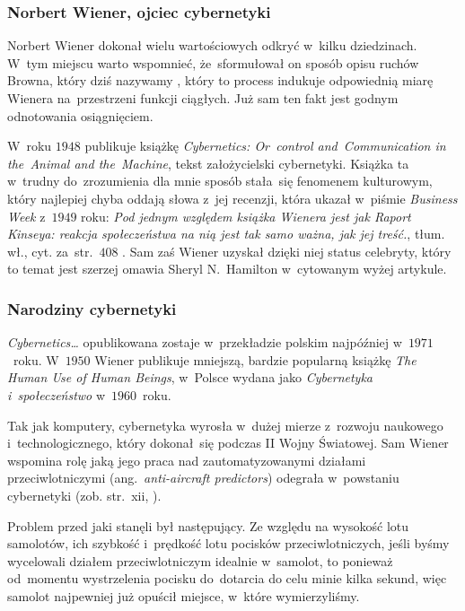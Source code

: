 \documentclass[10pt,t]{beamer}
\begin{document}
\begin{frame}
  \frametitle{Norbert Wiener, ojciec cybernetyki}


  Norbert Wiener dokonał wielu wartościowych odkryć w~kilku dziedzinach.
  W~tym miejscu warto wspomnieć, że~sformułował on sposób opisu ruchów
  Browna, który dziś nazywamy
  , który to process indukuje odpowiednią miarę Wienera
  na~przestrzeni funkcji ciągłych. Już sam ten fakt jest godnym odnotowania
  osiągnięciem.

  W~roku $1948$ publikuje książkę
  {\textit{Cybernetics: Or~control and~Communication in the~Animal and
      the~Machine}}, tekst założycielski cybernetyki. Książka ta w~trudny
  do~zrozumienia dla mnie sposób stała~się fenomenem kulturowym, który
  najlepiej chyba oddają słowa z~jej recenzji, która ukazał w~piśmie
  \textit{Business Week} z~$1949$ roku: \textit{Pod jednym względem książka
    Wienera jest jak Raport Kinseya: reakcja społeczeństwa na nią jest tak
    samo ważna, jak jej treść.}, tłum. wł., cyt. za~str.~$408$
  \parencite{Hamilton-The-Charismatic-Cultural-Life-of-ETC-Pub-2017}. Sam
  zaś Wiener uzyskał dzięki niej status celebryty, który to temat jest
  szerzej omawia Sheryl N.~Hamilton w~cytowanym wyżej artykule.

\end{frame}





\begin{frame}
  \frametitle{Narodziny cybernetyki}


  \textit{Cybernetics\ldots} opublikowana zostaje w~przekładzie polskim
  najpóźniej w~$1971$~roku. W~$1950$ Wiener publikuje mniejszą, bardzie
  popularną książkę
  {\textit{The Human Use of Human Beings}}, w~Polsce wydana jako
  \textit{Cybernetyka i~społeczeństwo} w~$1960$~roku.

  Tak jak komputery, cybernetyka wyrosła w~dużej mierze z~rozwoju naukowego
  i~technologicznego, który dokonał~się podczas II Wojny Światowej. Sam
  Wiener wspomina rolę jaką jego praca nad zautomatyzowanymi działami
  przeciwlotniczymi (ang.~\textit{anti-aircraft predictors}) odegrała
  w~powstaniu cybernetyki (zob. str.~xii,
  \parencite{Wiener-Cybernetics-Second-edition-Pub-2016}).

  Problem przed jaki stanęli był następujący. Ze względu na wysokość lotu
  samolotów, ich szybkość i~prędkość lotu pocisków przeciwlotniczych, jeśli
  byśmy wycelowali działem przeciwlotniczym idealnie w~samolot, to ponieważ
  od~momentu wystrzelenia pocisku do~dotarcia do celu minie kilka sekund,
  więc samolot najpewniej już opuścił miejsce, w~które wymierzyliśmy.

\end{frame}
\end{document}
